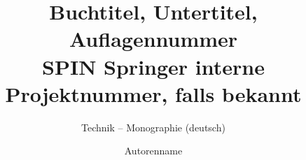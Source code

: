 \documentclass[fleqn]{article}
\begin{document}
\author{Autorenname}
\title{Buchtitel, Untertitel, Auflagennummer\\ {\small SPIN Springer
interne Projektnummer, falls bekannt}}
\subtitle{Technik -- Monographie (deutsch)}
\maketitle

\setcounter{page}{5}



\tableofcontents

\newpage
{}






\cleardoublepage
{}


\flushbottom
\printindex
\end{document}
